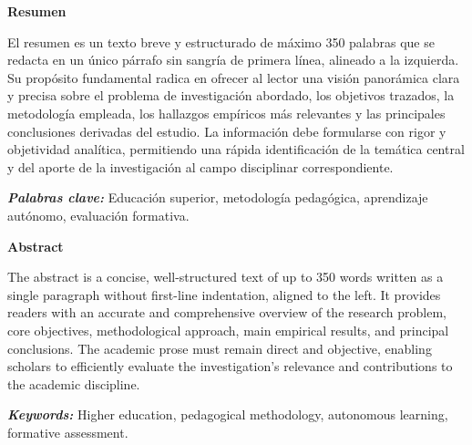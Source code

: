 \documentclass[12pt,letterpaper]{article}
\begin{document}
\clearpage
\begin{center}
    \textbf{\large Resumen}
\end{center}
\vspace{12pt}
\noindent El resumen es un texto breve y estructurado de máximo 350 palabras que se redacta en un único párrafo sin sangría de primera línea, alineado a la izquierda. Su propósito fundamental radica en ofrecer al lector una visión panorámica clara y precisa sobre el problema de investigación abordado, los objetivos trazados, la metodología empleada, los hallazgos empíricos más relevantes y las principales conclusiones derivadas del estudio. La información debe formularse con rigor y objetividad analítica, permitiendo una rápida identificación de la temática central y del aporte de la investigación al campo disciplinar correspondiente.

\vspace{12pt}
\noindent\hspace*{1.27cm}\textbf{\textit{Palabras clave:}} Educación superior, metodología pedagógica, aprendizaje autónomo, evaluación formativa.

\clearpage
\begin{center}
    \textbf{\large Abstract}
\end{center}
\vspace{12pt}
\noindent The abstract is a concise, well-structured text of up to 350 words written as a single paragraph without first-line indentation, aligned to the left. It provides readers with an accurate and comprehensive overview of the research problem, core objectives, methodological approach, main empirical results, and principal conclusions. The academic prose must remain direct and objective, enabling scholars to efficiently evaluate the investigation's relevance and contributions to the academic discipline.

\vspace{12pt}
\noindent\hspace*{1.27cm}\textbf{\textit{Keywords:}} Higher education, pedagogical methodology, autonomous learning, formative assessment.
\end{document}

